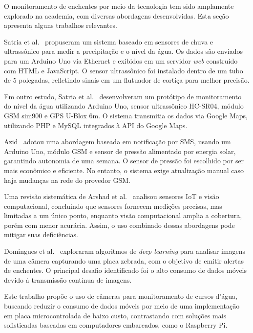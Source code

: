 \documentclass[12pt]{article}
\begin{document}
\begin{spacing}{1}

O monitoramento de enchentes por meio da tecnologia tem sido amplamente explorado na academia, com diversas abordagens desenvolvidas. Esta seção apresenta alguns trabalhos relevantes.

Satria et al.~\cite{satria2018design} propuseram um sistema baseado em sensores de chuva e ultrassônico para medir a precipitação e o nível da água. Os dados são enviados para um Arduino Uno via Ethernet e exibidos em um servidor \textit{web} construído com HTML e JavaScript. O sensor ultrassônico foi instalado dentro de um tubo de 5 polegadas, refletindo sinais em um flutuador de cortiça para melhor precisão.

Em outro estudo, Satria et al.~\cite{satria2017prototype} desenvolveram um protótipo de monitoramento do nível da água utilizando Arduino Uno, sensor ultrassônico HC-SR04, módulo GSM sim900 e GPS U-Blox 6m. O sistema transmitia os dados via Google Maps, utilizando PHP e MySQL integrados à API do Google Maps.

Azid~\cite{azid2015sms} adotou uma abordagem baseada em notificação por SMS, usando um Arduino Uno, módulo GSM e sensor de pressão alimentado por energia solar, garantindo autonomia de uma semana. O sensor de pressão foi escolhido por ser mais econômico e eficiente. No entanto, o sistema exige atualização manual caso haja mudanças na rede do provedor GSM.

Uma revisão sistemática de Arshad et al.~\cite{arshad2019computer} analisou sensores IoT e visão computacional, concluindo que sensores fornecem medições precisas, mas limitadas a um único ponto, enquanto visão computacional amplia a cobertura, porém com menor acurácia. Assim, o uso combinado dessas abordagens pode mitigar suas deficiências.

Domingues et al.~\cite{domingues2024deep} exploraram algoritmos de \textit{deep learning} para analisar imagens de uma câmera capturando uma placa zebrada, com o objetivo de emitir alertas de enchentes. O principal desafio identificado foi o alto consumo de dados móveis devido à transmissão contínua de imagens.

Este trabalho propõe o uso de câmeras para monitoramento de cursos d’água, buscando reduzir o consumo de dados móveis por meio de uma implementação em placa microcontrolada de baixo custo, contrastando com soluções mais sofisticadas baseadas em computadores embarcados, como o Raspberry Pi.


\end{spacing}
\end{document}
